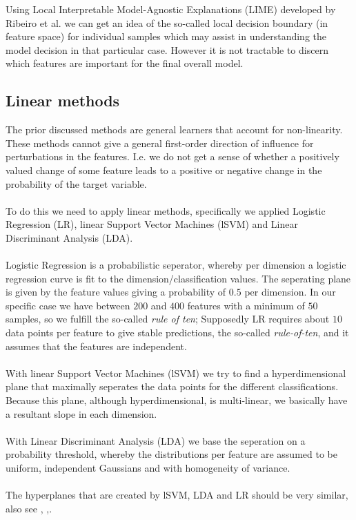 \documentclass[a4paper,10pt]{article}
\begin{document}
Using Local Interpretable Model-Agnostic Explanations (LIME) developed by Ribeiro et al.\cite{Ribeiro2016} 
we can get an idea of the so-called local decision boundary (in feature space) for individual samples which may assist in
understanding the model decision in that particular case. However it is not tractable to discern which features are important
for the final overall model.
%
\subsection{Linear methods}
%
The prior discussed methods are general learners that account for non-linearity.
These methods cannot give a general first-order direction of influence for 
perturbations in the features. I.e. we do not get a sense of whether a positively valued change of some feature leads to a positive or negative change in the probability of the target variable. \\ \\
%
To do this we need to apply linear methods, specifically 
we applied Logistic Regression (LR), linear Support Vector Machines (lSVM)
and Linear Discriminant Analysis (LDA). \\ \\
%
Logistic Regression is a probabilistic seperator, whereby per dimension a logistic regression curve
is fit to the dimension/classification values. The seperating plane is given by the feature values giving
a probability of $0.5$ per dimension. In our specific case we have between $200$ and $400$
features with a minimum of $50$ samples, so we fulfill the so-called \textit{rule of ten}; Supposedly LR requires about $10$ data points per feature to give stable predictions, the so-called \textit{rule-of-ten}, and it assumes that the features are independent. \\ \\
%
With linear Support Vector Machines (lSVM) we try to find a hyperdimensional
plane that maximally seperates the data points for the different classifications. Because this plane, although hyperdimensional, is multi-linear, we basically have a resultant slope in each dimension. \\ \\
%
With Linear Discriminant Analysis (LDA) we base the seperation on a probability threshold, whereby
the distributions per feature are assumed to be uniform, independent Gaussians and with homogeneity of variance. \\ \\
%
The hyperplanes that are created by lSVM, LDA and LR should be very similar, also see \cite{Pohar2004}, \cite{Yong2015},\cite{Gokcen2002}. 
%
\end{document}
